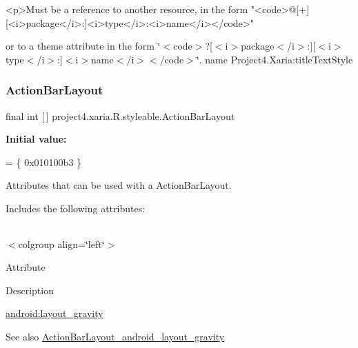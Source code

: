 \begin{DoxyVerb}      <p>Must be a reference to another resource, in the form "<code>@[+][<i>package</i>:]<i>type</i>:<i>name</i></code>"
\end{DoxyVerb}
 or to a theme attribute in the form \char`\"{}$<$code$>$?\mbox{[}$<$i$>$package$<$/i$>$\+:\mbox{]}\mbox{[}$<$i$>$type$<$/i$>$\+:\mbox{]}$<$i$>$name$<$/i$>$$<$/code$>$\char`\"{}.  name Project4.\+Xaria\+:title\+Text\+Style \mbox{\label{classproject4_1_1xaria_1_1R_1_1styleable_ada09e4a37ff0e4e66c0304b7927de70f}} 
\subsubsection{\texorpdfstring{Action\+Bar\+Layout}{ActionBarLayout}}
{\footnotesize\ttfamily final int \mbox{[}$\,$\mbox{]} project4.\+xaria.\+R.\+styleable.\+Action\+Bar\+Layout\hspace{0.3cm}{\ttfamily [static]}}

{\bfseries Initial value\+:}
\begin{DoxyCode}
= \{
            0x010100b3
        \}
\end{DoxyCode}
Attributes that can be used with a Action\+Bar\+Layout. 

Includes the following attributes\+:

\tabulinesep=1mm
\begin{longtabu} spread 0pt [c]{*{0}{|X[-1]}|}
\hline
\end{longtabu}
$<$colgroup align=\char`\"{}left\char`\"{}$>$ 

Attribute

Description 

{\ttfamily \hyperlink{classproject4_1_1xaria_1_1R_1_1styleable_afca42df30098e2a6a78629b9bf6f64f7}{android\+:layout\+\_\+gravity}}

\begin{DoxySeeAlso}{See also}
\hyperlink{classproject4_1_1xaria_1_1R_1_1styleable_afca42df30098e2a6a78629b9bf6f64f7}{Action\+Bar\+Layout\+\_\+android\+\_\+layout\+\_\+gravity} 
\end{DoxySeeAlso}
\mbox{\label{classproject4_1_1xaria_1_1R_1_1styleable_afca42df30098e2a6a78629b9bf6f64f7}} 
